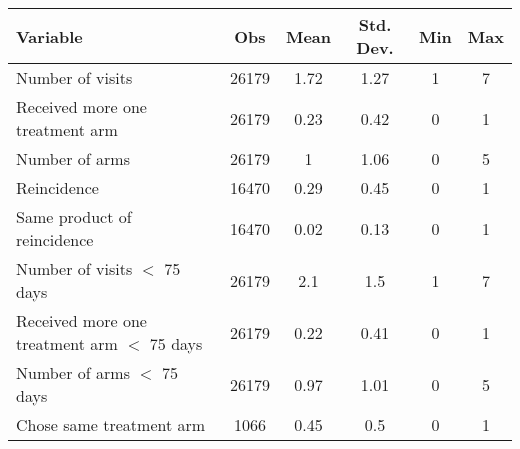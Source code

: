 \begin{tabular}{lccccc}
\toprule
Variable & Obs   & Mean  & Std. Dev. & Min   & Max \\
\midrule
\midrule
Number of visits & 26179 & 1.72  & 1.27  & 1     & 7 \\
Received more one treatment arm & 26179 & 0.23  & 0.42  & 0     & 1 \\
Number of arms & 26179 & 1     & 1.06  & 0     & 5 \\
Reincidence & 16470 & 0.29  & 0.45  & 0     & 1 \\
Same product of reincidence & 16470 & 0.02  & 0.13  & 0     & 1 \\
Number of visits $<$ 75 days & 26179 & 2.1   & 1.5   & 1     & 7 \\
Received more one treatment arm $<$ 75 days & 26179 & 0.22  & 0.41  & 0     & 1 \\
Number of arms  $<$ 75 days & 26179 & 0.97  & 1.01  & 0     & 5 \\
Chose same treatment arm & 1066  & 0.45  & 0.5   & 0     & 1 \\
\bottomrule
\bottomrule
\end{tabular}%
